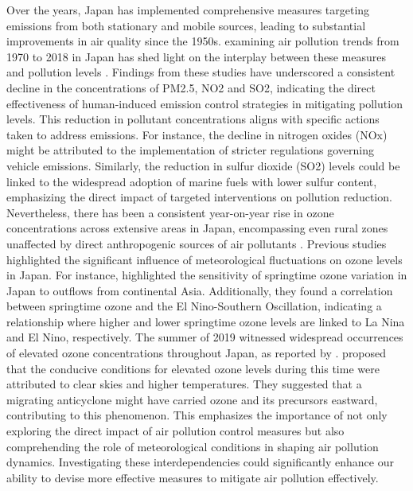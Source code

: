 Over the years, Japan has implemented comprehensive measures targeting emissions from both stationary and mobile sources, leading to substantial improvements in air quality since the 1950s. examining air pollution trends from 1970 to 2018 in Japan has shed light on the interplay between these measures and pollution levels \citep{ito202130, kannari2013thirty, wakamatsu2013air}. Findings from these studies have underscored a consistent decline in the concentrations of PM2.5, NO2 and SO2, indicating the direct effectiveness of human-induced emission control strategies in mitigating pollution levels. This reduction in pollutant concentrations aligns with specific actions taken to address emissions. For instance, the decline in nitrogen oxides (NOx) might be attributed to the implementation of stricter regulations governing vehicle emissions. Similarly, the reduction in sulfur dioxide (SO2) levels could be linked to the widespread adoption of marine fuels with lower sulfur content, emphasizing the direct impact of targeted interventions on pollution reduction. Nevertheless, there has been a consistent year-on-year rise in ozone concentrations across extensive areas in Japan, encompassing even rural zones unaffected by direct anthropogenic sources of air pollutants \citep{ito202130}. Previous studies highlighted the significant influence of meteorological fluctuations on ozone levels in Japan. For instance, \citep{kurokawa2009influence} highlighted the sensitivity of springtime ozone variation in Japan to outflows from continental Asia. Additionally, they found a correlation between springtime ozone and the El Nino-Southern Oscillation, indicating a relationship where higher and lower springtime ozone levels are linked to La Nina and El Nino, respectively. The summer of 2019 witnessed widespread occurrences of elevated ozone concentrations throughout Japan, as reported by \citep{fukunaga2021relationship, ito202130}.\citep{fukunaga2021relationship} proposed that the conducive conditions for elevated ozone levels during this time were attributed to clear skies and higher temperatures. They suggested that a migrating anticyclone might have carried ozone and its precursors eastward, contributing to this phenomenon. This emphasizes the importance of not only exploring the direct impact of air pollution control measures but also comprehending the role of meteorological conditions in shaping air pollution dynamics. Investigating these interdependencies could significantly enhance our ability to devise more effective measures to mitigate air pollution effectively. \par

